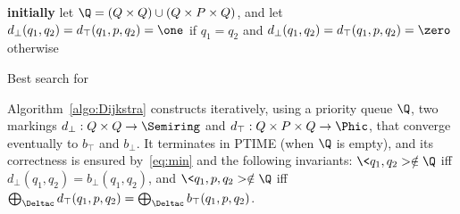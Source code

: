

\begin{algorithm}

\textbf{initially} let $\Q = (Q \times Q) \cup (Q \times P \times Q)$,
and let $d_\bot(q_1, q_2) = d_\top(q_1, p, q_2) = \one$
if $q_1 = q_2$ and $d_\bot(q_1, q_2) = d_\top(q_1, p, q_2) = \zero$ otherwise$\;$

\smallskip\noindent
{}
\caption{Best search for \SWVPA}
\label{algo:Dijkstra}
\end{algorithm}




Algorithm~\ref{algo:Dijkstra} constructs iteratively, using a priority queue $\Q$, 
two markings
$d_\bot : Q \times Q \to \Semiring$ and
$d_\top : Q \times P \times Q \to \Phic$,
that converge eventually to $b_\top$ and $b_\bot$. 
%
%
%
%
It terminates in PTIME (when $\Q$ is empty), 
and its correctness is ensured by~\eqref{eq:min} and  
the following invariants: 
$\< q_1, q_2> \notin \Q$ iff $d_\bot(q_1, q_2) = b_\bot(q_1, q_2)$, 
and $\< q_1, p, q_2> \notin \Q$ iff 
$\bigoplus_{\Deltac} d_\top(q_1, p, q_2) = \bigoplus_{\Deltac} b_\top(q_1, p, q_2)$.


